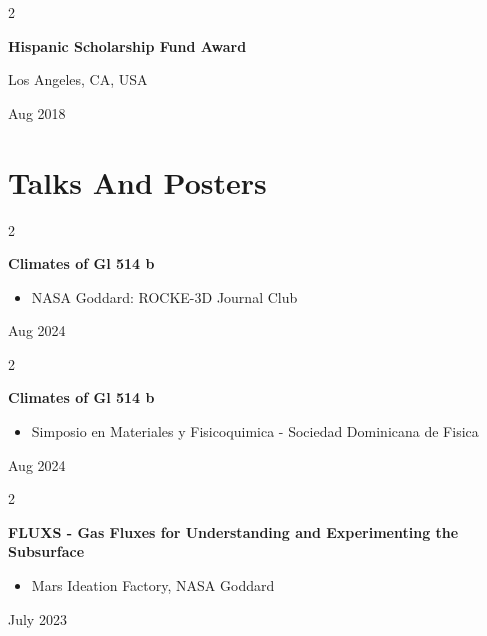 \documentclass[10pt, letterpaper]{article}
\newenvironment{highlights}{
    \begin{itemize}[
        topsep=0.10 cm,
        parsep=0.10 cm,
        partopsep=0pt,
        itemsep=0pt,
        leftmargin=0.4 cm + 10pt
    ]
}{
    \end{itemize}
} %
\newenvironment{twocolentry}[2][]{
    \onecolentry
    \def\secondColumn{#2}
    \setcolumnwidth{\fill, 4.5 cm}
    \begin{paracol}{2}
}{
    \switchcolumn \raggedleft \secondColumn
    \end{paracol}
    \endonecolentry
} %
\begin{document}
        \vspace{0.2 cm}

        \begin{twocolentry}{
            Los Angeles, CA, USA

        Aug 2018
        }
            \textbf{Hispanic Scholarship Fund Award}
        \end{twocolentry}



    
    \section{Talks And Posters}



        
        \begin{twocolentry}{
            Aug 2024
        }
            \textbf{Climates of Gl 514 b}
            \begin{highlights}
                \item NASA Goddard: ROCKE-3D Journal Club
            \end{highlights}
        \end{twocolentry}


        \vspace{0.2 cm}

        \begin{twocolentry}{
            Aug 2024
        }
            \textbf{Climates of Gl 514 b}
            \begin{highlights}
                \item Simposio en Materiales y Fisicoquimica - Sociedad Dominicana de Fisica
            \end{highlights}
        \end{twocolentry}


        \vspace{0.2 cm}

        \begin{twocolentry}{
            July 2023
        }
            \textbf{FLUXS - Gas Fluxes for Understanding and Experimenting the Subsurface}
            \begin{highlights}
                \item Mars Ideation Factory, NASA Goddard
            \end{highlights}
        \end{twocolentry}


        \vspace{0.2 cm}
\end{document}
